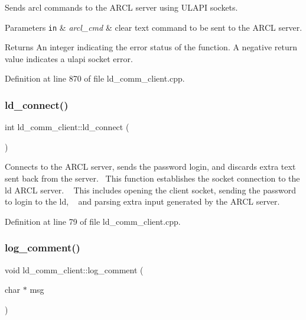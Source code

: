 Sends arcl commands to the A\+R\+CL server using U\+L\+A\+PI sockets. 
\begin{DoxyParams}[1]{Parameters}
\mbox{\tt in}  & {\em arcl\+\_\+cmd} & clear text command to be sent to the A\+R\+CL server. \\
\hline
\end{DoxyParams}
\begin{DoxyReturn}{Returns}
An integer indicating the error status of the function. A negative return value indicates a ulapi socket error. 
\end{DoxyReturn}


Definition at line 870 of file ld\+\_\+comm\+\_\+client.\+cpp.

\mbox{\label{classld__comm__client_a254638599da673cf2f376166a8f9b984}} 
\subsubsection{\texorpdfstring{ld\+\_\+connect()}{ld\_connect()}}
{\footnotesize\ttfamily int ld\+\_\+comm\+\_\+client\+::ld\+\_\+connect (\begin{DoxyParamCaption}{ }\end{DoxyParamCaption})}

Connects to the A\+R\+CL server, sends the password login, and discards extra text sent back from the server.~\newline
 This function establishes the socket connection to the ld A\+R\+CL server. ~\newline
This includes opening the client socket, sending the password to login to the ld, ~\newline
and parsing extra input generated by the A\+R\+CL server. ~\newline


Definition at line 79 of file ld\+\_\+comm\+\_\+client.\+cpp.

\mbox{\label{classld__comm__client_a8e2124bb6da72ba99ab9d713510e2303}} 
\subsubsection{\texorpdfstring{log\+\_\+comment()}{log\_comment()}}
{\footnotesize\ttfamily void ld\+\_\+comm\+\_\+client\+::log\+\_\+comment (\begin{DoxyParamCaption}\item[{char $\ast$}]{msg }\end{DoxyParamCaption})}

